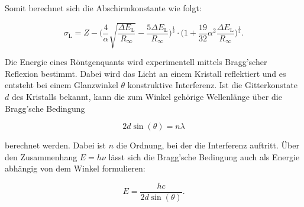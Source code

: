 Somit berechnet sich die Abschirmkonstante wie folgt:

\begin{equation}
    \label{eqn:abschirm}
    \sigma_\text{L} = Z - \bigg( \frac{4}{\alpha} \sqrt{\frac{\Delta E_\text{L}}{R_\infty }} - \frac{5 \Delta E_\text{L}}{R_\infty} \bigg)^\frac{1}{2} \cdot \bigg( 1 + \frac{19}{32} \alpha^2 \frac{\Delta E_\text{L}}{R_\infty} \bigg)^\frac{1}{2}.
\end{equation}

Die Energie eines Röntgenquants wird experimentell mittels Bragg'scher Reflexion bestimmt.
Dabei wird das Licht an einem Kristall reflektiert und es entsteht bei einem Glanzwinkel $\theta$ konstruktive Interferenz.
Ist die Gitterkonstate $d$ des Kristalls bekannt, kann die zum Winkel gehörige Wellenlänge über die Bragg'sche Bedingung

\begin{equation}
    \label{eqn:bragg}
    2 d \sin (\theta) = n \lambda
\end{equation}

berechnet werden. Dabei ist $n$ die Ordnung, bei der die Interferenz auftritt.
Über den Zusammenhang $E = h \nu$ lässt sich die Bragg'sche Bedingung auch als Energie abhängig von dem Winkel formulieren:

\begin{equation}
    \label{eqn:bragg-energie}
    E = \frac{h c}{2 d \sin (\theta )}.
\end{equation}
